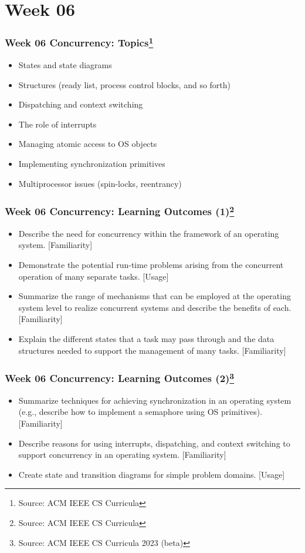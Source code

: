 
\section{Week 06}
\begin{frame}[fragile]
\frametitle{Week 06 Concurrency:
Topics\footnote{Source: ACM IEEE CS Curricula}}

\begin{itemize}
\item States and state diagrams 
\item Structures (ready list, process control blocks, and so forth) 
\item Dispatching and context switching 
\item The role of interrupts 
\item Managing atomic access to OS objects 
\item Implementing synchronization primitives 
\item Multiprocessor issues (spin-locks, reentrancy)  
\end{itemize}
\end{frame}

\begin{frame}[fragile]
\frametitle{Week 06 Concurrency:
Learning Outcomes (1)\footnote{Source: ACM IEEE CS Curricula}}
\begin{itemize}
\item Describe the need for concurrency within the framework of an operating system. [Familiarity] 
\item Demonstrate the potential run-time problems arising from the concurrent operation of many separate tasks. [Usage] 
\item Summarize the range of mechanisms that can be employed at the operating system level to realize concurrent systems and describe the benefits of each. [Familiarity] 
\item Explain the different states that a task may pass through and the data structures needed to support the management of many tasks. [Familiarity] 
\end{itemize}
\end{frame}


\begin{frame}[fragile]
\frametitle{Week 06 Concurrency:
Learning Outcomes (2)\footnote{Source: ACM IEEE CS Curricula 2023 (beta)}}
\begin{itemize}
\item Summarize techniques for achieving synchronization in an operating system (e.g., describe how to implement a semaphore using OS primitives). [Familiarity] 
\item Describe reasons for using interrupts, dispatching, and context switching to support concurrency in an operating system. [Familiarity] 
\item Create state and transition diagrams for simple problem domains. [Usage] 
\end{itemize}
\end{frame}

